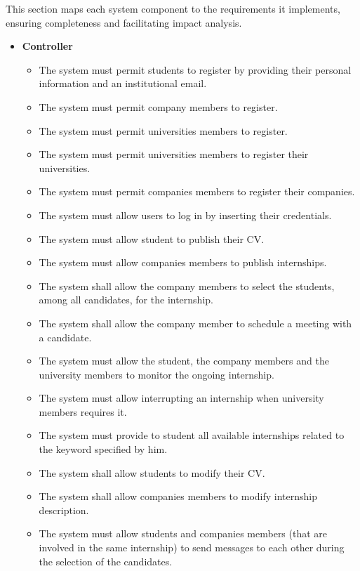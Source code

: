 This section maps each system component to the requirements it implements, ensuring completeness and facilitating impact analysis.
\begin{itemize}
    \item \textbf{Controller}
    \begin{itemize}
        \item [\text{ [R1] }] The system must permit students to register by providing their personal information and an institutional email.
        \item [\text{ [R2] }] The system must permit company members to register.
        \item [\text{ [R3] }] The system must permit universities members to register.
        \item [\text{ [R4] }] The system must permit universities members to register their universities.
        \item [\text{ [R5] }] The system must permit companies members to register their companies.
        \item [\text{ [R6] }] The system must allow users to log in by inserting their credentials.
        \item [\text{ [R7] }] The system must allow student to publish their CV.
        \item [\text{ [R8] }] The system must allow companies members to publish internships.
        \item [\text{ [R14] }] The system shall allow the company members to select the students, among all candidates, for the internship.
        \item [\text{ [R17] }] The system shall allow the company member to schedule a meeting with a candidate.
        \item [\text{ [R18] }] The system must allow the student, the company members and the university members to monitor the ongoing internship.
        \item [\text{ [R19] }] The system must allow interrupting an internship when university members requires it.
        \item [\text{ [R20] }] The system must provide to student all available internships related to the keyword specified by him.
        \item [\text{ [R23] }] The system shall allow students to modify their CV.
        \item [\text{ [R24] }] The system shall allow companies members to modify internship description.
        \item [\text{ [R25] }] The system must allow students and companies members (that are involved in the same internship) to send messages to each other during the selection of the candidates.

\end{itemize}
\end{itemize}
